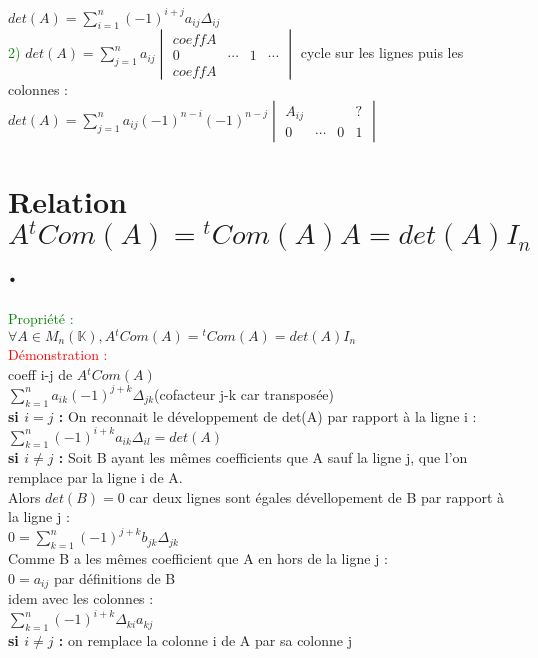 \documentclass{article}
\begin{document}
    $det(A)=\sum_{i=1}^n (-1)^{i+j} a_{ij} \Delta_{ij}$ \\
    \textcolor{green}{2)} $det(A)= \sum_{j=1}^n a_{ij} \begin{vmatrix} coeff A \\ 0 & \cdots & 1 & \cdots \\ coeff A \end{vmatrix}$
    cycle sur les lignes puis les colonnes  : \\
    $det(A)=\sum_{j=1}^n a_{ij} (-1)^{n-i}(-1)^{n-j} \begin{vmatrix}A_{ij} & &  & ? \\ 0 & \cdots & 0 & 1\end{vmatrix}$
      
\section{Relation $A {}^tCom(A)={}^tCom(A)A=det(A)I_n$.}
      \textcolor{green}{Propriété :} \\
      $\forall A \in M_n(\mathbb K),  A {}^t Com(A)= {}^t Com(A)= det(A)I_n$ \\
      \textcolor{red}{Démonstration : } \\
      coeff i-j de $A{}^t Com(A)$ \\
      $\sum_{k=1}^n a_{ik} (-1)^{j+k} \Delta_{jk}$(cofacteur j-k car transposée) \\
      {\bf si \boldmath $i = j$ :} On reconnait le développement de det(A) par rapport à la ligne i : \\
      $\sum_{k=1}^n (-1)^{i+k}a_{ik}\Delta_{il}=det(A)$ \\
      {\bf si \boldmath $i \neq j$ :} Soit B ayant les mêmes coefficients  que A sauf la ligne j, que l'on remplace par la ligne i de A. \\
      Alors $det(B) = 0$ car deux lignes sont égales dévellopement de B par rapport à la ligne j : \\
      $0=\sum_{k=1}^n (-1)^{j+k} b_{jk} \Delta_{jk}$ \\
      Comme B a les mêmes coefficient que A en hors de la ligne j : \\
      $0=a_{ij}$ par définitions de B \\
      idem avec les colonnes : \\
      $\sum_{k=1}^n (-1)^{i+k} \Delta_{ki} a_{kj}$ \\
      {\bf \boldmath si $i\neq j$ :} on remplace la colonne i de A par sa colonne j
\end{document}
